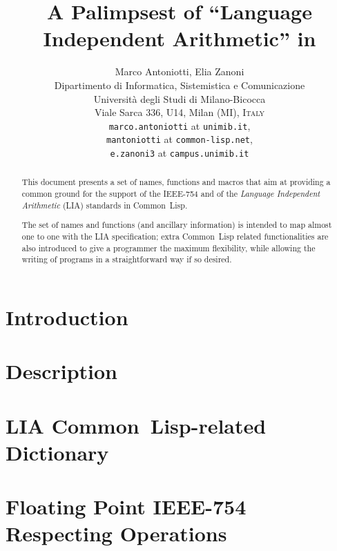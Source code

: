 \documentclass[10pt,fleqn]{article}
\title{
\LARGE{\bfseries A Palimpsest of ``Language Independent Arithmetic'' in \CL{}}}
\author{
  Marco Antoniotti, Elia Zanoni\\
  Dipartimento di Informatica, Sistemistica e Comunicazione\\
  Universit\`{a} degli Studi di Milano-Bicocca\\
  Viale Sarca 336, U14, Milan (MI), \textsc{Italy}\\[2mm]
  \texttt{marco.antoniotti} at \texttt{unimib.it},\\
  \texttt{mantoniotti} at \texttt{common-lisp.net},\\
  \texttt{e.zanoni3} at \texttt{campus.unimib.it}}
\newcommand{\CL}{\textsf{Common~Lisp}}
\newcommand{\IEEEFPStd}{IEEE-754}
\begin{document}
\maketitle


\begin{abstract}
  This document presents a set of names, functions and macros that aim
  at providing a common ground for the support of the \IEEEFPStd{}
  \cite{2008:IEEE-754} and of the \emph{Language Independent
    Arithmetic} (LIA) standards \cite{2012:LIA1,2001:LIA2,2004:LIA3}
  in \CL{}.

  The set of names and functions (and ancillary information) is
  intended to map almost one to one with the LIA specification; extra
  \CL{} related functionalities are also introduced to give a
  programmer the maximum flexibility, while allowing the writing of
  programs in a straightforward way if so desired.
\end{abstract}

\newpage

\tableofcontents

\newpage

\section{Introduction}

\newpage

\section{Description}

\newpage

\section{LIA \CL{}-related Dictionary}

\newpage

\section{Floating Point \IEEEFPStd{} Respecting Operations}

\newpage

\nocite{2012:LIA1,2001:LIA2,2004:LIA3}
\nocite{1994:ANSICL}




\end{document}
